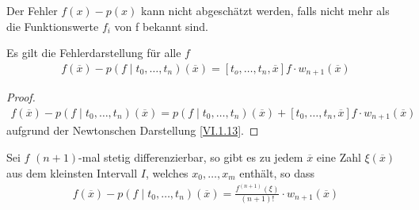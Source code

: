 Der Fehler $f(x) -p(x) $ kann nicht abgeschätzt werden,
falls nicht mehr als die Funktionswerte $f_i$ von f bekannt sind.

\begin{Satze}
  Es gilt die Fehlerdarstellung für alle $f$
  \begin{gather}
    f(\overline{x})-p(f\mid t_0,\dots, t_n)(\overline{x})
    = [t_o,\dots,t_n,\overline{x}]f\cdot w_{n+1}(\overline{x})
    \label{VI.1.22}
  \end{gather}
\end{Satze}

\begin{proof}
  \begin{gather*}
    f(\overline{x})- p(f\mid t_0,\dots, t_n)(\overline{x})
    = p(f\mid  t_0,\dots, t_n)(\overline{x})
    + [t_0,\dots, t_n,\overline{x}]f\cdot w_{n+1}(\overline{x})
  \end{gather*}
  aufgrund der Newtonschen Darstellung \eqref{VI.1.13}.
\end{proof}


\begin{Satze}[Restglieddarstellung]
  Sei $f$ $(n+1)$-mal stetig differenzierbar,
  so gibt es zu jedem $\overline{x}$ eine Zahl $\xi(\overline{x})$
  aus dem kleinsten Intervall $I$, welches $x_0,\dots, x_m$ enthält,
  so dass 
  \begin{gather}
    f(\overline{x})-p(f\mid t_0,\dots,t_n)(\overline{x})
    = \frac{f^{(n+1)}(\xi)}{(n+1)!}\cdot w_{n+1}(\overline{x})
    \label{VI.1.21}
  \end{gather}
\end{Satze}


